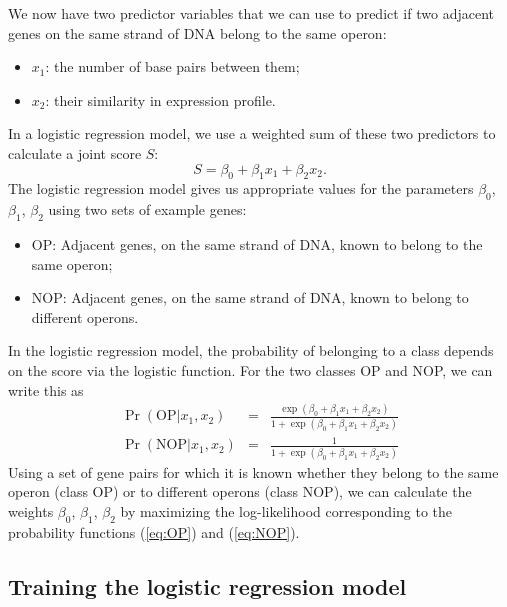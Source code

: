 \documentclass{report}
\begin{document}
We now have two predictor variables that we can use to predict if two adjacent genes on the same strand of DNA belong to the same operon:
\begin{itemize}
\item $x_1$: the number of base pairs between them;
\item $x_2$: their similarity in expression profile.
\end{itemize}

In a logistic regression model, we use a weighted sum of these two predictors to calculate a joint score $S$:
\begin{equation}
S = \beta_0 + \beta_1 x_1 + \beta_2 x_2.
\end{equation}
The logistic regression model gives us appropriate values for the parameters $\beta_0$, $\beta_1$, $\beta_2$ using two sets of example genes:
\begin{itemize}
\item OP: Adjacent genes, on the same strand of DNA, known to belong to the same operon;
\item NOP: Adjacent genes, on the same strand of DNA, known to belong to different operons.
\end{itemize}

In the logistic regression model, the probability of belonging to a class depends on the score via the logistic function. For the two classes OP and NOP, we can write this as
\begin{eqnarray}
\Pr(\mathrm{OP}|x_1, x_2) & = & \frac{\exp(\beta_0 + \beta_1 x_1 + \beta_2 x_2)}{1+\exp(\beta_0 + \beta_1 x_1 + \beta_2 x_2)} \label{eq:OP} \\
\Pr(\mathrm{NOP}|x_1, x_2) & = & \frac{1}{1+\exp(\beta_0 + \beta_1 x_1 + \beta_2 x_2)} \label{eq:NOP} 
\end{eqnarray}
Using a set of gene pairs for which it is known whether they belong to the same operon (class OP) or to different operons (class NOP), we can calculate the weights $\beta_0$, $\beta_1$, $\beta_2$ by maximizing the log-likelihood corresponding to the probability functions (\ref{eq:OP}) and (\ref{eq:NOP}).

\subsection{Training the logistic regression model}
\label{subsec:LogisticRegressionTraining}
\end{document}
